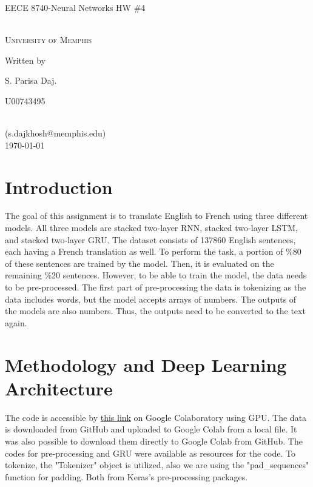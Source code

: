 \documentclass[12pt,oneside,geqno]{article}
\begin{document}
	
	\begin{center}
		{\LARGE EECE 8740-Neural Networks HW \#4}%
		\vspace*{1\baselineskip}   
		
		\scshape %
		\color{red}{(Solutions)}\\
		\vspace*{1\baselineskip}
		\color{black}University of Memphis\\[\baselineskip]
		\vspace*{5\baselineskip} 
		
		Written by \\[\baselineskip]
		{\Large S. Parisa Daj.\par U00743495} \\
		(s.dajkhosh@memphis.edu)\\
		
		\vspace*{1\baselineskip}
		\today
	\end{center}
	\clearpage
	
	
	\section{Introduction}
	The goal of this assignment is to translate English to French using three different models. All three models are stacked two-layer RNN, stacked two-layer LSTM, and stacked two-layer GRU. The dataset consists of 137860 English sentences, each having a French translation as well. To perform the task, a portion of \%80 of these sentences are trained by the model. Then, it is evaluated on the remaining \%20 sentences. However, to be able to train the model, the data needs to be pre-processed. The first part of pre-processing the data is tokenizing as the data includes words, but the model accepts arrays of numbers. The outputs of the models are also numbers. Thus, the outputs need to be converted to the text again.
	
	\section{Methodology and Deep Learning Architecture}
	The code is accessible by \href{https://colab.research.google.com/drive/1D5zuU2iycZJFkAeJsVisMA7ne8joUwxD?usp=sharing}{this link} on Google Colaboratory using GPU. The data is downloaded from GitHub and uploaded to Google Colab from a local file. It was also possible to download them directly to Google Colab from GitHub. The codes for pre-processing and GRU were available as resources for the code. To tokenize, the "Tokenizer" object is utilized, also we are using the "pad\_sequences" function for padding. Both from Keras's pre-processing packages. 
	
\end{document}

